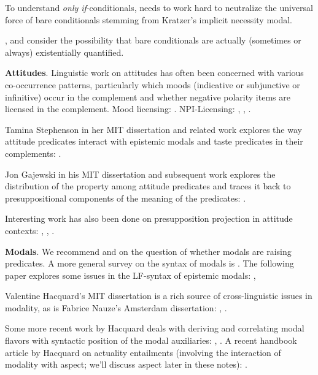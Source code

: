 To understand \emph{only if}-conditionals,
\cite{fintel-1997-BarePluralsBareConditionalsOnly} needs to work
hard to neutralize the universal force of bare conditionals stemming from
Kratzer's implicit necessity modal.

\cite{herburger-2015-only-if,herburger-2016-perfection}, and
\cite{bassi-bar-lev-2017-unified-existential} consider the possibility that
bare conditionals are actually (sometimes or always) existentially quantified.

\textbf{Attitudes}. Linguistic work on attitudes has often been concerned with
various co-occurrence patterns, particularly which moods (indicative or
subjunctive or infinitive) occur in the complement and whether negative polarity
items are licensed in the complement. Mood licensing:
\cite{portner-1997-MoodComplementationConversationalForce}. NPI-Licensing:
\cite{kadmon-landman-1993-any}, \cite{fintel-1999-npi},
\cite{giannakidou-1999-affective}.

Tamina Stephenson in her MIT dissertation and related work explores the way
attitude predicates interact with epistemic modals and taste predicates in their
complements: \cite{stephenson-2007-judge-lp,stephenson-2007-thesis}.

Jon Gajewski in his MIT dissertation and subsequent work explores the
distribution of the  property among attitude predicates and
traces it back to presuppositional components of the meaning of the predicates:
\cite{gajewski-2005-thesis,gajewski-2007-neg-raising}.

Interesting work has also been done on presupposition projection in attitude
contexts: \cite{asher-1987-attitudes}, \cite{heim-1992-attitude},
\cite{geurts-1998-attitudes}.

\textbf{Modals}. We recommend \cite{bhatt-1997-haveto} and \cite{wurmbrand-1999-raising} on the question of whether modals are raising predicates. A more general survey on the syntax of modals is \cite{barbiers-vandooren-2017-ModalAuxiliaries}. The following paper
explores some issues in the LF-syntax of epistemic modals:
\cite{fintel-iatridou-2003-ec},

Valentine Hacquard's MIT dissertation is a rich source of
cross-linguistic issues in modality, as is Fabrice Nauze's Amsterdam
dissertation: \cite{hacquard-2006-dissertation},  \cite{nauze-2008-thesis}.

Some more recent work by Hacquard deals with deriving and correlating modal
flavors with syntactic position of the modal auxiliaries:
\cite{hacquard-2010-event-relativity}, \cite{hacquard-2013-modality}. A recent
handbook article by Hacquard on actuality entailments (involving the interaction
of modality with aspect; we'll discuss aspect later in these notes):
\cite{hacquard-2020-ActualityEntailments}.

